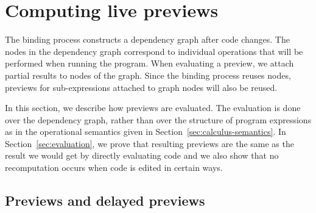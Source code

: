 \documentclass[english,submission]{programming}
\theoremstyle{plain}
\theoremstyle{definition}
\begin{document}

\section{Computing live previews}
\label{sec:previews}

The binding process constructs a dependency graph after code changes. The nodes in the dependency
graph correspond to individual operations that will be performed when running the program. When
evaluating a preview, we attach partial results to nodes of the graph. Since the binding process
reuses nodes, previews for sub-expressions attached to graph nodes will also be reused.

In this section, we describe how previews are evaluated. The evaluation is done over the dependency
graph, rather than over the structure of program expressions as in the operational semantics
given in Section~\ref{sec:calculus-semantics}. In Section~\ref{sec:evaluation}, we prove that
resulting previews are the same as the result we would get by directly evaluating code and we
also show that no recomputation occurs when code is edited in certain ways.


\subsection{Previews and delayed previews}
\end{document}
